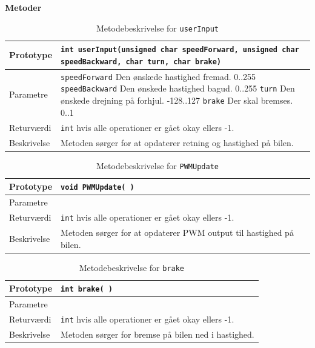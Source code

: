\newpage
\textbf{Metoder} 


\begin{table}[H]
\begin{tabularx}{\textwidth}{| L{2.5 cm} | Z |} \hline
Prototype & \texttt{int userInput(unsigned char speedForward, unsigned char speedBackward, 
	char turn, char brake)} \\\hline
Parametre & \texttt{speedForward} \newline Den ønskede hastighed fremad. 0..255\newline
		\texttt{speedBackward} \newline Den ønskede hastighed bagud. 0..255\newline
		\texttt{turn} \newline Den ønskede drejning på forhjul. -128..127\newline
		\texttt{brake} \newline Der skal bremses. 0..1\newline 
 \\\hline
Returværdi &  \texttt{int}  hvis alle operationer er gået okay ellers -1. \\\hline
Beskrivelse & Metoden sørger for at opdaterer retning og hastighed på bilen. \\\hline
\end{tabularx}
\caption{Metodebeskrivelse for \texttt{userInput}}
\label{table:met_userInput}
\end{table}



\begin{table}[H]
	\begin{tabularx}{\textwidth}{| L{2.5 cm} | Z |} \hline
		Prototype & \texttt{void PWMUpdate( )} \\\hline
		Parametre &   
		\\\hline
		Returværdi &  \texttt{int}  hvis alle operationer er gået okay ellers -1. \\\hline
		Beskrivelse & Metoden sørger for at opdaterer PWM output til hastighed på bilen. \\\hline
	\end{tabularx}
	\caption{Metodebeskrivelse for \texttt{PWMUpdate}}
	\label{table:met_PWMUpdate}
\end{table}

\begin{table}[H]
	\begin{tabularx}{\textwidth}{| L{2.5 cm} | Z |} \hline
		Prototype & \texttt{int brake( )} \\\hline
		Parametre & 
		\\\hline
		Returværdi &  \texttt{int}  hvis alle operationer er gået okay ellers -1. \\\hline
		Beskrivelse & Metoden sørger for bremse på bilen ned i hastighed. \\\hline
	\end{tabularx}
	\caption{Metodebeskrivelse for \texttt{brake}}
	\label{table:met_brake}
\end{table}

